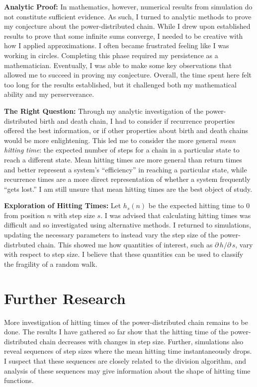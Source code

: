 \documentclass[12pt,letterpaper]{article}
\begin{document}
\noindent
\textbf{Analytic Proof:} In mathematics, however, numerical results from simulation do not constitute
sufficient evidence. As such, I turned to analytic methods to prove my conjecture about the
power-distributed chain. While I drew upon established results to prove that some infinite sums
converge, I needed to be creative with how I applied approximations. I often became frustrated feeling
like I was working in circles. Completing this phase required my persistence as a mathematician.
Eventually, I was able to make some key observations that allowed me to succeed in proving my
conjecture.  Overall, the time spent here felt too long for the results established, but it challenged
both my mathematical ability and my perserverance.

\noindent \textbf{The Right Question:} Through my analytic investigation of the power-distributed birth
and death chain, I had to consider if recurrence properties offered the best information, or if other
properties about birth and death chains would be more enlightening. This led me to consider the more
general \emph{mean hitting time}: the expected number of steps for a chain in a particular state to
reach a different state. Mean hitting times are more general than return times and better represent
a system's ``efficiency'' in reaching a particular state, while recurrence times are a more direct
representation of whether a system frequently ``gets lost.'' I am still unsure that mean hitting times
are the best object of study.

\noindent
\textbf{Exploration of Hitting Times:} Let $h_s(n)$ be the expected hitting time to $0$ from position
$n$ with step size $s$. I was advised that calculating hitting times was difficult and so investigated
using alternative methods. I returned to simulations, updating the necessary parameters to instead vary
the step size of the power-distrbuted chain. This showed me how quantities of interest, such as
$\partial\, h/ \partial\, s$, vary with respect to step size. I believe that these quantities can be
used to classify the fragility of a random walk.


\section*{Further Research}
More investigation of hitting times of the power-distributed chain remains to be done. The results I
have gathered so far show that the hitting time of the power-distributed chain decreases with changes in
step size. Further, simulations also reveal sequences of step sizes where the mean hitting time
instantaneously drops. I suspect that these sequences are closely related to the division algorithm, and
analysis of these sequences may give information about the shape of hitting time functions.
\end{document}
